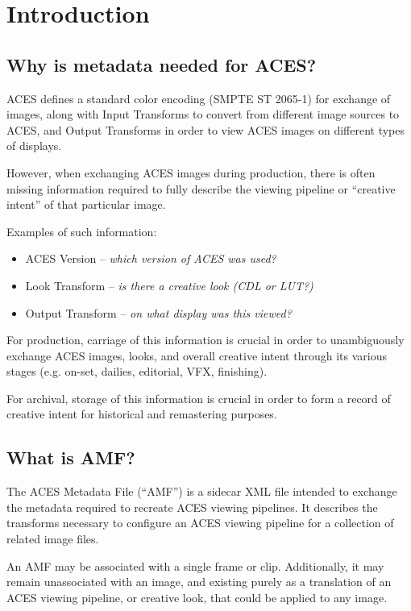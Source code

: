 \regularsectionformat	%
\chapter{Introduction}

\section{Why is metadata needed for ACES?}

ACES defines a standard color encoding (SMPTE ST 2065-1) for exchange of images, along with Input Transforms to convert from different image sources to ACES, and Output Transforms in order to view ACES images on different types of displays.

However, when exchanging ACES images during production, there is often missing information required to fully describe the viewing pipeline or ``creative intent'' of that particular image.

Examples of such information:
\begin{itemize}
    \item ACES Version -- \textit{which version of ACES was used?}
    \item Look Transform -- \textit{is there a creative look (CDL or LUT?)}
    \item Output Transform -- \textit{on what display was this viewed?}
\end{itemize}

For production, carriage of this information is crucial in order to unambiguously exchange ACES images, looks, and overall creative intent through its various stages (e.g. on-set, dailies, editorial, VFX, finishing).

For archival, storage of this information is crucial in order to form a record of creative intent for historical and remastering purposes.

\section{What is AMF?}
The ACES Metadata File (``AMF'') is a sidecar XML file intended to exchange the metadata required to recreate ACES viewing pipelines. It describes the transforms necessary to configure an ACES viewing pipeline for a collection of related image files.

An AMF may be associated with a single frame or clip. Additionally, it may remain unassociated with an image, and existing purely as a translation of an ACES viewing pipeline, or creative look, that could be applied to any image.

